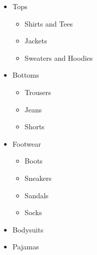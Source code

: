 \begin{itemize}
\setlength{\itemsep}{-3pt}
\setlength{\parskip}{0pt}
\setlength{\parsep}{0pt}

	 \item Tops
	 	\begin{itemize}
\setlength{\itemsep}{-3pt}
\setlength{\parskip}{0pt}
\setlength{\parsep}{0pt}
		 \item Shirts and Tees
      	 \item Jackets
      	 \item Sweaters and Hoodies
		\end{itemize}
     \item Bottoms
	 	\begin{itemize}
\setlength{\itemsep}{-3pt}
\setlength{\parskip}{0pt}
\setlength{\parsep}{0pt}
		 \item Trousers
		 \item Jeans
		 \item Shorts
		\end{itemize}
	 \item Footwear
	 	\begin{itemize}
\setlength{\itemsep}{-3pt}
\setlength{\parskip}{0pt}
\setlength{\parsep}{0pt}
		 \item Boots
		 \item Sneakers
		 \item Sandals
		 \item Socks
		\end{itemize}
	 \item Bodysuits	
     \item Pajamas
	\end{itemize}

